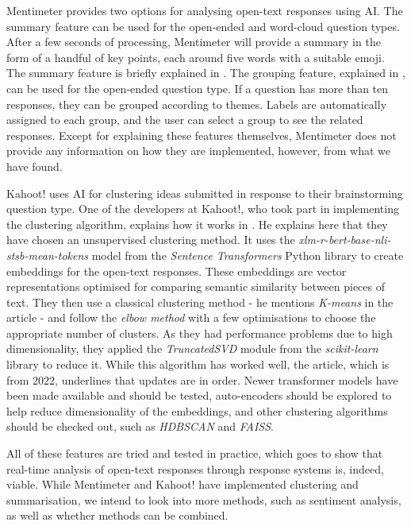 Mentimeter provides two options for analysing open-text responses using AI. The summary feature can be used for the open-ended and word-cloud question types. After a few seconds of processing, Mentimeter will provide a summary in the form of a handful of key points, each around five words with a suitable emoji. The summary feature is briefly explained in \cite{mentisummary}. The grouping feature, explained in \cite{mentigrouping}, can be used for the open-ended question type. If a question has more than ten responses, they can be grouped according to themes. Labels are automatically assigned to each group, and the user can select a group to see the related responses. Except for explaining these features themselves, Mentimeter does not provide any information on how they are implemented, however, from what we have found.

Kahoot! uses AI for clustering ideas submitted in response to their brainstorming question type. One of the developers at Kahoot!, who took part in implementing the clustering algorithm, explains how it works in \cite{kahootclustering}. He explains here that they have chosen an unsupervised clustering method. It uses the \textit{xlm-r-bert-base-nli-stsb-mean-tokens} model from the \textit{Sentence Transformers} Python library to create embeddings for the open-text responses. These embeddings are vector representations optimised for comparing semantic similarity between pieces of text. They then use a classical clustering method - he mentions \textit{K-means} in the article - and follow the \textit{elbow method} with a few optimisations to choose the appropriate number of clusters. As they had performance problems due to high dimensionality, they applied the \textit{TruncatedSVD} module from the \textit{scikit-learn} library to reduce it. While this algorithm has worked well, the article, which is from 2022, underlines that updates are in order. Newer transformer models have been made available and should be tested, auto-encoders should be explored to help reduce dimensionality of the embeddings, and other clustering algorithms should be checked out, such as \textit{HDBSCAN} and \textit{FAISS}.

All of these features are tried and tested in practice, which goes to show that real-time analysis of open-text responses through response systems is, indeed, viable. While Mentimeter and Kahoot! have implemented clustering and summarisation, we intend to look into more methods, such as sentiment analysis, as well as whether methods can be combined.

